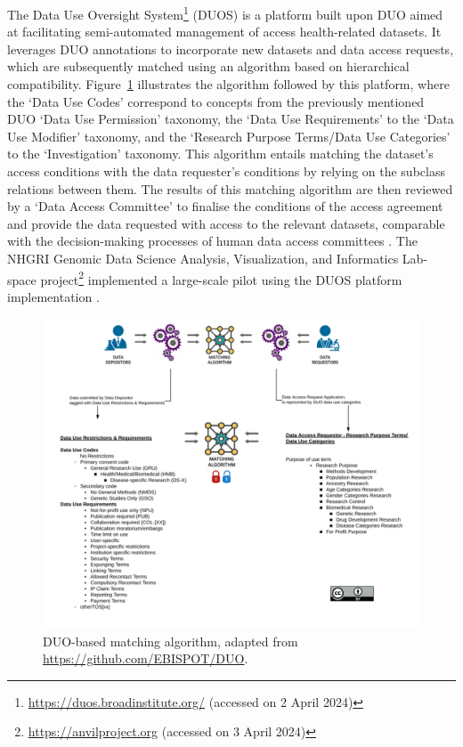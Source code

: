 The Data Use Oversight System\footnote{\url{https://duos.broadinstitute.org/} (accessed on 2 April 2024)} (DUOS) is a platform built upon DUO aimed at facilitating semi-automated management of access health-related datasets.
It leverages DUO annotations to incorporate new datasets and data access requests, which are subsequently matched using an algorithm based on hierarchical compatibility.
Figure~\ref{fig:duo-matching} illustrates the algorithm followed by this platform, where the `Data Use Codes' correspond to concepts from the previously mentioned DUO `Data Use Permission' taxonomy,  the `Data Use Requirements' to the `Data Use Modifier' taxonomy, and the `Research Purpose Terms/Data Use Categories' to the `Investigation' taxonomy.
This algorithm entails matching the dataset's access conditions with the data requester's conditions by relying on the subclass relations between them.
The results of this matching algorithm are then reviewed by a `Data Access Committee' to finalise the conditions of the access agreement and provide the data requested with access to the relevant datasets, comparable with the decision-making processes of human data access committees \citep{cabili_empirical_2021}.
The NHGRI Genomic Data Science Analysis, Visualization, and Informatics Lab-space project\footnote{\url{https://anvilproject.org} (accessed on 3 April 2024)} implemented a large-scale pilot using the DUOS platform implementation \citep{schatz_inverting_2022}.

\begin{figure}[ht]
    \centering
    \includegraphics[width=1\linewidth]{figures//chapter-6/DUO-matching-with-license.png}
    \caption[DUO-based matching algorithm.]{DUO-based matching algorithm, adapted from \url{https://github.com/EBISPOT/DUO}.}
    \label{fig:duo-matching}
\end{figure}

